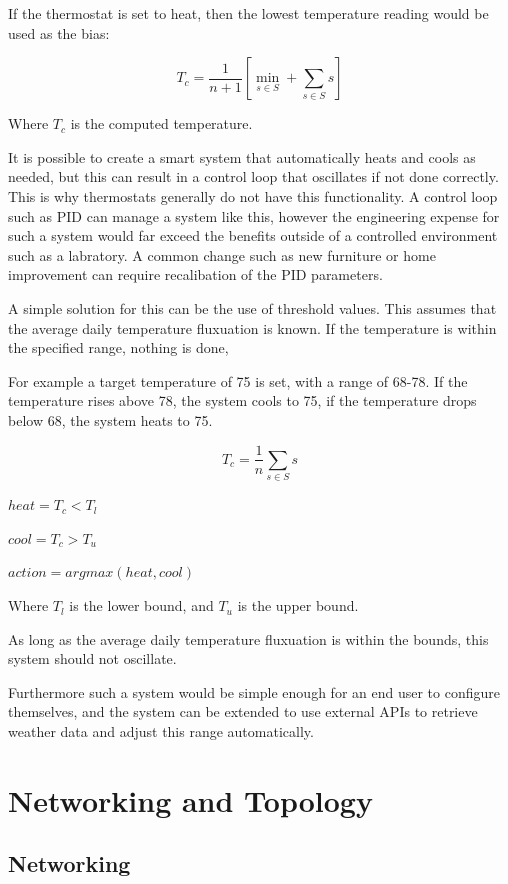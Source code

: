 \documentclass[10pt, journal]{IEEEtran} %
\begin{document}
If the thermostat is set to heat,
then the lowest temperature reading would be used as the bias:

\[
T_c = \frac{1}{n+1}\left[ \min_{s \in S} + \sum_{s \in S}{s} \right]
\]

Where $T_c$ is the computed temperature.

\bigskip


It is possible to create a smart system that automatically heats and cools as needed,
but this can result in a control loop that oscillates if not done correctly.
This is why thermostats generally do not have this functionality.
A control loop such as PID can manage a system like this,
however the engineering expense for such a system would far exceed the benefits 
outside of a controlled environment such as a labratory.
A common change such as new furniture or home improvement
can require recalibation of the PID parameters.

A simple solution for this can be the use of threshold values.
This assumes that the average daily temperature fluxuation is known.
If the temperature is within the specified range, nothing is done,

For example a target temperature of 75 is set, with a range of 68-78.
If the temperature rises above 78, the system cools to 75,
if the temperature drops below 68, the system heats to 75.

\[
T_c = \frac{1}{n}\sum_{s \in S}{s}
\]

$heat = T_c < T_l$

$cool = T_c > T_u$

$action = argmax(heat, cool)$

\smallskip

Where $T_l$ is the lower bound, and $T_u$ is the upper bound.

\bigskip

As long as the average daily temperature fluxuation is within the bounds,
this system should not oscillate.

Furthermore such a system would be simple enough for an end user to configure themselves,
and the system can be extended to use external APIs to retrieve weather data 
and adjust this range automatically.

\section{Networking and Topology}

\subsection{Networking}
\end{document}
